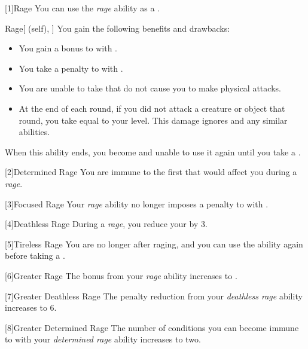         [1]{Rage} You can use the \textit{rage} ability as a .
        \begin{attuneability}{Rage}[ (self), ]
            You gain the following benefits and drawbacks:
            \begin{itemize}
                \item You gain a  bonus to  with .
                \item You take a  penalty to  with .
                \item You are unable to take  that do not cause you to make physical attacks.
                \item At the end of each round, if you did not attack a creature or object that round, you take  equal to your level.
                    This damage ignores  and any similar abilities.
            \end{itemize}
            When this ability ends, you become \fatigued and unable to use it again until you take a .
        \end{attuneability}

        [2]{Determined Rage}
        You are immune to the first  that would affect you during a \textit{rage}.

        [3]{Focused Rage}
        Your \textit{rage} ability no longer imposes a penalty to  with .

        [4]{Deathless Rage}
        During a \textit{rage}, you reduce your  by 3.

        [5]{Tireless Rage} You are no longer  after raging, and you can use the ability again before taking a .

        [6]{Greater Rage} The  bonus from your \textit{rage} ability increases to .

        [7]{Greater Deathless Rage}
        The penalty reduction from your \textit{deathless rage} ability increases to 6.

        [8]{Greater Determined Rage}
        The number of conditions you can become immune to with your \textit{determined rage} ability increases to two.

